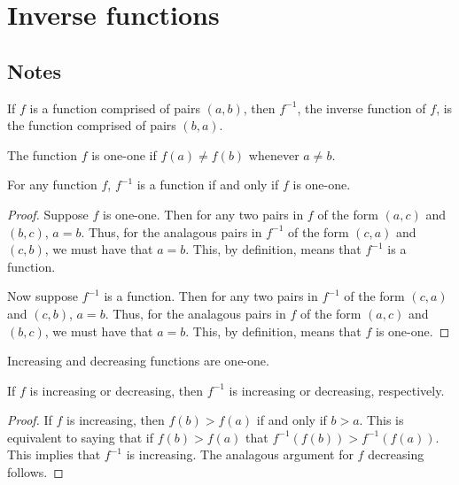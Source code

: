 \section{Inverse functions}

\subsection{Notes}

\begin{definition}
If $f$ is a function comprised of pairs $(a, b)$, then $f^{-1}$, the inverse function of $f$, is the function comprised of pairs $(b, a)$.
\end{definition}

\begin{definition}
The function $f$ is one-one if $f(a) \ne f(b)$ whenever $a \ne b$.
\end{definition}

\begin{theorem}
For any function $f$, $f^{-1}$ is a function if and only if $f$ is one-one.

\begin{proof}
Suppose $f$ is one-one. Then for any two pairs in $f$ of the form $(a, c)$ and $(b, c)$, $a = b$. Thus, for the analagous pairs in $f^{-1}$ of the form $(c, a)$ and $(c, b)$, we must have that $a = b$. This, by definition, means that $f^{-1}$ is a function.

Now suppose $f^{-1}$ is a function. Then for any two pairs in $f^{-1}$ of the form $(c, a)$ and $(c, b)$, $a = b$. Thus, for the analagous pairs in $f$ of the form $(a, c)$ and $(b, c)$, we must have that $a = b$. This, by definition, means that $f$ is one-one.
\end{proof}
\end{theorem}

\begin{proposition} \label{incdecone}
Increasing and decreasing functions are one-one.
\end{proposition}

\begin{theorem} \label{fincmeansfinvinc}
If $f$ is increasing or decreasing, then $f^{-1}$ is increasing or decreasing, respectively.

\begin{proof}
If $f$ is increasing, then $f(b) > f(a)$ if and only if $b > a$. This is equivalent to saying that if $f(b) > f(a)$ that $f^{-1}(f(b)) > f^{-1}(f(a))$. This implies that $f^{-1}$ is increasing. The analagous argument for $f$ decreasing follows.
\end{proof}
\end{theorem}


